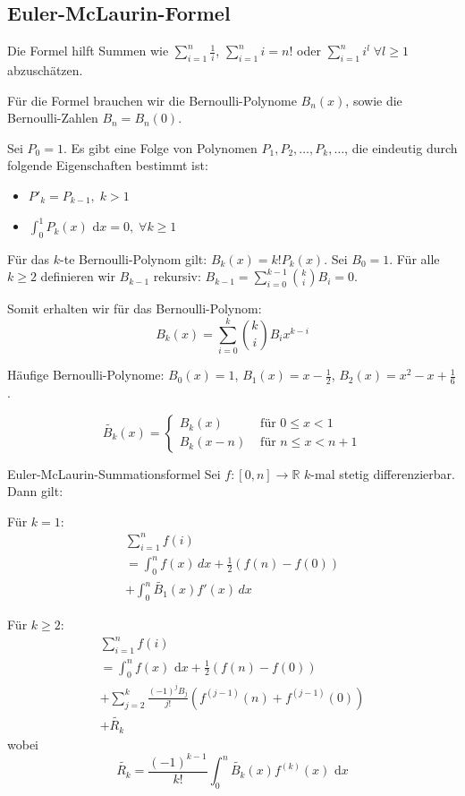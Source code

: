 \documentclass[a4paper,10pt]{article}
\def\R{\mathbb{R}}
\def\dx{\text{ d}x}
\begin{document}
\subsection{Euler-McLaurin-Formel}
Die Formel hilft Summen wie $\sum_{i=1}^n \frac{1}{i}$, $\sum_{i=1}^n i = n!$ oder $\sum_{i=1}^n i^l \; \forall l \geq 1$ abzuschätzen.

Für die Formel brauchen wir die Bernoulli-Polynome $B_n(x)$, sowie die Bernoulli-Zahlen $B_n = B_n(0)$.

Sei $P_0 = 1$. Es gibt eine Folge von Polynomen $P_1, P_2, \dots, P_k, \dots$, die eindeutig durch folgende Eigenschaften bestimmt ist:
\begin{itemize}
  \item $P'_k = P_{k-1}, \; k > 1$
  \item $\int_0^1 P_k(x)\dx = 0, \; \forall k \geq 1$
\end{itemize}

Für das $k$-te Bernoulli-Polynom gilt: $B_k(x) = k!P_k(x)$. Sei $B_0=1$. Für alle $k \geq 2$ definieren wir $B_{k - 1}$ rekursiv: $B_{k-1} = \sum_{i=0}^{k-1}{k \choose i}B_i = 0$.

Somit erhalten wir für das Bernoulli-Polynom:
$$B_k(x) = \sum_{i=0}^{k}{k \choose i}B_ix^{k-i}$$

Häufige Bernoulli-Polynome: $B_0(x) = 1$, $B_1(x) = x - \frac{1}{2}$, $B_2(x) = x^2 - x + \frac{1}{6}$.

$$\widetilde{B_k}(x) = \begin{cases}
  B_k(x) & \text{ für } 0 \leq x < 1 \\
  B_k(x-n) & \text{ für } n \leq x < n + 1
\end{cases}$$

\begin{mainbox}{Euler-McLaurin-Summationsformel}
  Sei $f: [0, n] \to \R$ $k$-mal stetig differenzierbar. Dann gilt:
  
  Für $k = 1$:
  \begin{multline*}
  \sum_{i = 1}^n f(i) \\
  = \int_0^n f(x) \, dx + \frac{1}{2}(f(n) - f(0)) \\
  + \int_0^n \widetilde{B_1}(x)f'(x) \, dx
  \end{multline*}
  
  Für $k \geq 2$:
  \begin{multline*}
  \sum_{i = 1}^n f(i) \\
  = \int_0^n f(x) \dx + \frac{1}{2}(f(n) - f(0)) \\
  + \sum_{j = 2}^k \frac{(-1)^j B_j}{j!}(f^{(j-1)}(n) + f^{(j-1)}(0)) \\
  + \widetilde{R_k}
  \end{multline*}
  wobei
  $$ \widetilde{R_k} = \frac{(-1)^{k-1}}{k!} \int_0^n \widetilde{B_k}(x)f^{(k)}(x)\dx$$
\end{mainbox}
\end{document}
